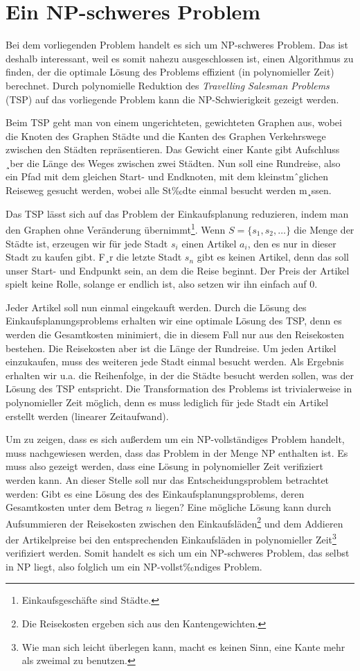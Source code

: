 \section{Ein NP-schweres Problem}
Bei dem vorliegenden Problem handelt es sich um NP-schweres Problem. Das ist deshalb interessant, weil es somit nahezu ausgeschlossen ist, einen Algorithmus zu finden, der die optimale Lösung des Problems effizient (in polynomieller Zeit) berechnet. Durch polynomielle Reduktion des \emph{Travelling Salesman Problems} (TSP) auf das vorliegende Problem kann die NP-Schwierigkeit gezeigt werden.

Beim TSP geht man von einem ungerichteten, gewichteten Graphen aus, wobei die Knoten des Graphen Städte und die Kanten des Graphen Verkehrswege zwischen den Städten repräsentieren. Das Gewicht einer Kante gibt Aufschluss ¸ber die Länge des Weges zwischen zwei Städten. Nun soll eine Rundreise, also ein Pfad mit dem gleichen Start- und Endknoten, mit dem kleinstmˆglichen Reiseweg gesucht werden, wobei alle St‰dte einmal besucht werden m¸ssen.

Das TSP lässt sich auf das Problem der Einkaufsplanung reduzieren, indem man den Graphen ohne Veränderung übernimmt\footnote{Einkaufsgeschäfte sind Städte.}. Wenn $S=\{s_1, s_2, \ldots\}$ die Menge der Städte ist, erzeugen wir für jede Stadt $s_i$ einen Artikel $a_i$, den es nur in dieser Stadt zu kaufen gibt. F¸r die letzte Stadt $s_n$ gibt es keinen Artikel, denn das soll unser Start- und Endpunkt sein, an dem die Reise beginnt. Der Preis der Artikel spielt keine Rolle, solange er endlich ist, also setzen wir ihn einfach auf $0$.

Jeder Artikel soll nun einmal eingekauft werden. Durch die Lösung des Einkaufsplanungsproblems erhalten wir eine optimale Lösung des TSP, denn es werden die Gesamtkosten minimiert, die in diesem Fall nur aus den Reisekosten bestehen. Die Reisekosten aber ist die Länge der Rundreise. Um jeden Artikel einzukaufen, muss des weiteren jede Stadt einmal besucht werden. Als Ergebnis erhalten wir u.a. die Reihenfolge, in der die Städte besucht werden sollen, was der Lösung des TSP entspricht. Die Transformation des Problems ist trivialerweise in polynomieller Zeit möglich, denn es muss lediglich für jede Stadt ein Artikel erstellt werden (linearer Zeitaufwand).

Um zu zeigen, dass es sich außerdem um ein NP-vollständiges Problem handelt, muss nachgewiesen werden, dass das Problem in der Menge NP enthalten ist. Es muss also gezeigt werden, dass eine Lösung in polynomieller Zeit verifiziert werden kann. An dieser Stelle soll nur das Entscheidungsproblem betrachtet werden: Gibt es eine Lösung des des Einkaufsplanungsproblems, deren Gesamtkosten unter dem Betrag $n$ liegen? Eine mögliche Lösung kann durch Aufsummieren der Reisekosten zwischen den Einkaufsläden\footnote{Die Reisekosten ergeben sich aus den Kantengewichten.} und dem Addieren der Artikelpreise bei den entsprechenden Einkaufsläden in polynomieller Zeit\footnote{Wie man sich leicht überlegen kann, macht es keinen Sinn, eine Kante mehr als zweimal zu benutzen.} verifiziert werden. Somit handelt es sich um ein NP-schweres Problem, das selbst in NP liegt, also folglich um ein NP-vollst‰ndiges Problem.

